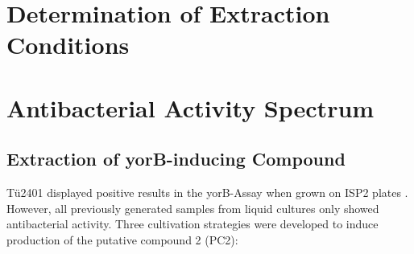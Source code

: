 
\section{Determination of Extraction Conditions} %
\label{sec:determination_of_extraction_conditions}


\section{Antibacterial Activity Spectrum} %
\label{sec:antibacterial_activity_spectrum}

    \subsection{Extraction of yorB-inducing Compound} %
    \label{sub:extraction_of_yorb_inducing_compound}

    Tü2401 displayed positive results in the yorB-Assay  when grown on ISP2 plates . However, all previously generated samples from liquid cultures only showed antibacterial activity.
    Three cultivation strategies were developed to induce production of the putative compound 2 (PC2):

